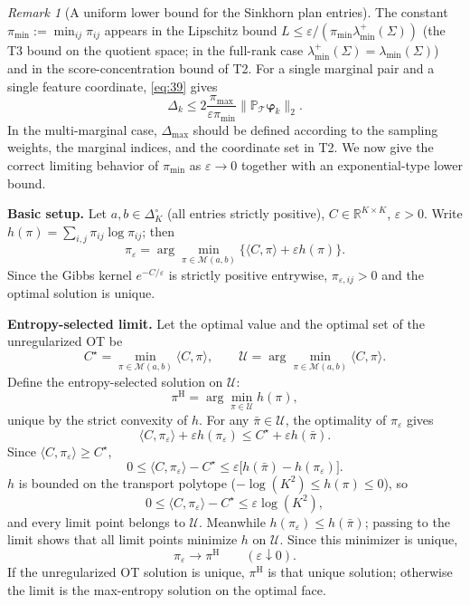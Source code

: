 \documentclass[11pt,a4paper]{article}
\theoremstyle{remark}
\newtheorem{remark}[theorem]{Remark}
\renewcommand{\phi}{\bm{\varphi}}
\begin{document}
\begin{remark}[A uniform lower bound for the Sinkhorn plan entries]\label{rem:pimin_bound}
The constant $\pi_{\min}:=\min_{ij}\pi_{ij}$ appears in the Lipschitz bound
$L\le\varepsilon/(\pi_{\min}\lambda_{\min}^{+}(\Sigma))$ (the T3 bound on the quotient
space; in the full-rank case $\lambda_{\min}^{+}(\Sigma)=\lambda_{\min}(\Sigma)$) and in
the score-concentration bound of T2. For a single marginal pair and a single feature
coordinate, \eqref{eq:39} gives
\[
\Delta_k\le 2\frac{\pi_{\max}}{\varepsilon\pi_{\min}}\|\mathbb{P}_{\mathcal{T}}\phi_k\|_2.
\]
In the multi-marginal case, $\Delta_{\max}$ should be defined according to the sampling
weights, the marginal indices, and the coordinate set in T2. We now give the correct
limiting behavior of $\pi_{\min}$ as $\varepsilon\to0$ together with an exponential-type
lower bound.

\medskip
\noindent\textbf{Basic setup.} Let $a,b\in\Delta_K^\circ$ (all entries strictly positive),
$C\in\mathbb{R}^{K\times K}$, $\varepsilon>0$. Write
$h(\pi)=\sum_{i,j}\pi_{ij}\log\pi_{ij}$; then
\[
\pi_\varepsilon = \arg\min_{\pi\in\mathcal{M}(a,b)}\{\langle C,\pi\rangle+\varepsilon h(\pi)\}.
\]
Since the Gibbs kernel $e^{-C/\varepsilon}$ is strictly positive entrywise,
$\pi_{\varepsilon,ij}>0$ and the optimal solution is unique.

\medskip
\noindent\textbf{Entropy-selected limit.} Let the optimal value and the optimal set of the
unregularized OT be
\[
C^\star = \min_{\pi\in\mathcal{M}(a,b)}\langle C,\pi\rangle,\qquad
\mathcal{U} = \arg\min_{\pi\in\mathcal{M}(a,b)}\langle C,\pi\rangle.
\]
Define the entropy-selected solution on $\mathcal{U}$:
\[
\pi^{\mathrm H} = \arg\min_{\pi\in\mathcal{U}}h(\pi),
\]
unique by the strict convexity of $h$. For any $\bar\pi\in\mathcal{U}$, the optimality of
$\pi_\varepsilon$ gives
\[
\langle C,\pi_\varepsilon\rangle+\varepsilon h(\pi_\varepsilon)\le C^\star+\varepsilon h(\bar\pi).
\]
Since $\langle C,\pi_\varepsilon\rangle\ge C^\star$,
\[
0\le\langle C,\pi_\varepsilon\rangle-C^\star\le\varepsilon\bigl[h(\bar\pi)-h(\pi_\varepsilon)\bigr].
\]
$h$ is bounded on the transport polytope ($-\log(K^2)\le h(\pi)\le0$), so
\[
0\le\langle C,\pi_\varepsilon\rangle-C^\star\le\varepsilon\log(K^2),
\]
and every limit point belongs to $\mathcal{U}$. Meanwhile $h(\pi_\varepsilon)\le h(\bar\pi)$;
passing to the limit shows that all limit points minimize $h$ on $\mathcal{U}$. Since this
minimizer is unique,
\[
\boxed{\pi_\varepsilon\longrightarrow\pi^{\mathrm H}}\qquad(\varepsilon\downarrow0).
\]
If the unregularized OT solution is unique, $\pi^{\mathrm H}$ is that unique solution;
otherwise the limit is the max-entropy solution on the optimal face.


\end{remark}
\end{document}
